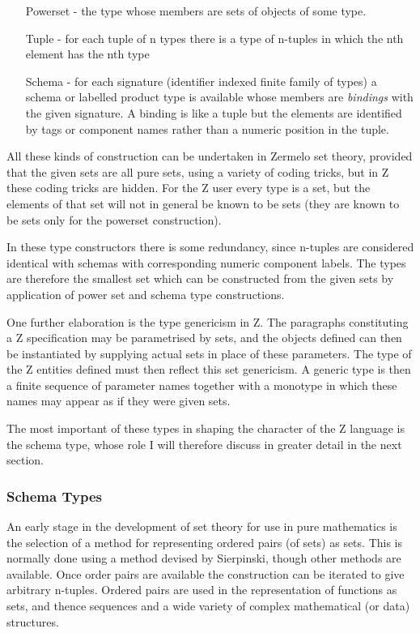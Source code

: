 \documentclass[10pt,titlepage]{book}
\begin{document}
\begin{itemize}
\item[Powerset] - the type whose members are sets of objects of some type.
\item[Tuple] - for each tuple of n types there is a type of n-tuples in which the nth element has the nth type
\item[Schema] - for each signature (identifier indexed finite family of types) a schema or labelled product type is available whose members are {\it bindings} with the given signature.
A binding is like a tuple but the elements are identified by tags or component names rather than a numeric position in the tuple.
\end{itemize}

All these kinds of construction can be undertaken in Zermelo set theory, provided that the given sets are all pure sets, using a variety of coding tricks, but in Z these coding tricks are hidden.
For the Z user every type is a set, but the elements of that set will not in general be known to be sets (they are known to be sets only for the powerset construction).

In these type constructors there is some redundancy, since n-tuples are considered identical with schemas with corresponding numeric component labels.
The types are therefore the smallest set which can be constructed from the given sets by application of power set and schema type constructions.

One further elaboration is the type genericism in Z.
The paragraphs constituting a Z specification may be parametrised by sets, and the objects defined can then be instantiated by supplying actual sets in place of these parameters.
The type of the Z entities defined must then reflect this set genericism.
A generic type is then a finite sequence of parameter names together with a monotype in which these names may appear as if they were given sets.

The most important of these types in shaping the character of the Z language is the schema type, whose role I will therefore discuss in greater detail in the next section.

\subsubsection{Schema Types}

An early stage in the development of set theory for use in pure mathematics is the selection of a method for representing ordered pairs (of sets) as sets.
This is normally done using a method devised by Sierpinski, though other methods are available.
Once order pairs are available the construction can be iterated to give arbitrary n-tuples.
Ordered pairs are used in the representation of functions as sets, and thence sequences and a wide variety of complex mathematical (or data) structures.
\end{document}
